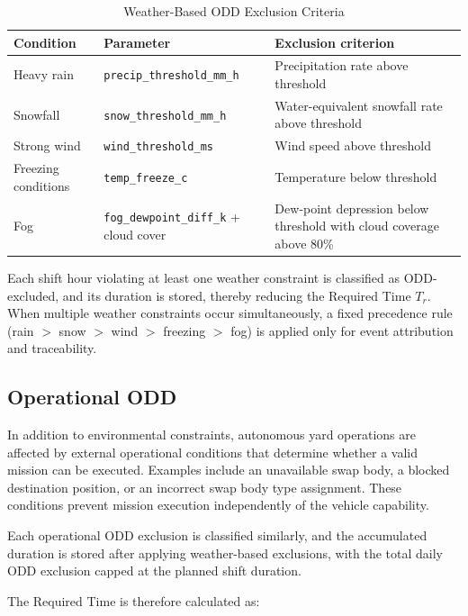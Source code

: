 \begin{table}[H]
\scriptsize
\renewcommand{\arraystretch}{1.4}
\centering
\caption{Weather-Based ODD Exclusion Criteria}
\label{tab:weather-odd-criteria}
\begin{tabular}{|p{2.4cm}|p{3.8cm}|p{5.3cm}|}
\hline
\textbf{Condition} & \textbf{Parameter} & \textbf{Exclusion criterion} \\
\hline
Heavy rain & \texttt{precip\_threshold\_mm\_h} & Precipitation rate above threshold \\
\hline
Snowfall & \texttt{snow\_threshold\_mm\_h} & Water-equivalent snowfall rate above threshold \\
\hline
Strong wind & \texttt{wind\_threshold\_ms} & Wind speed above threshold \\
\hline
Freezing conditions & \texttt{temp\_freeze\_c} & Temperature below threshold \\
\hline
Fog & \texttt{fog\_dewpoint\_diff\_k} + cloud cover & Dew-point depression below threshold with cloud coverage above 80\% \\
\hline
\end{tabular}
\end{table}

Each shift hour violating at least one weather constraint is classified as ODD-excluded, and its duration is stored, thereby reducing the Required Time $T_r$. When multiple weather constraints occur simultaneously, a fixed precedence rule (rain $>$ snow $>$ wind $>$ freezing $>$ fog) is applied only for event attribution and traceability.

\subsection{Operational ODD}

In addition to environmental constraints, autonomous yard operations are affected by external operational conditions that determine whether a valid mission can be executed. Examples include an unavailable swap body, a blocked destination position, or an incorrect swap body type assignment. These conditions prevent mission execution independently of the vehicle capability.

Each operational ODD exclusion is classified similarly, and the accumulated duration is stored after applying weather-based exclusions, with the total daily ODD exclusion capped at the planned shift duration.

The Required Time is therefore calculated as:

